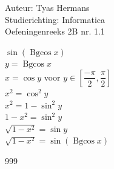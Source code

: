\documentclass[a4paper]{article}
\begin{document}
  
\noindent \large Auteur: Tyas Hermans \\
\noindent \large Studierichting: Informatica\\
\noindent \large Oefeningenreeks 2B  nr. 1.1 \\

\medskip

\normalsize

$\sin(\operatorname{Bgcos}x)$\\

$y = \operatorname{Bgcos}x$\\

$x = \cos y$ voor $y \in \left[\dfrac{-\pi}{2},\dfrac{\pi}{2}\right]$\\

$x^2 = \cos^2 y$\\

$x^2 = 1 - \sin^2 y$\\

$1-x^2 = \sin^2 y$\\

$\sqrt{1-x^2} = \sin y$\\

$\sqrt{1-x^2} = \sin(\operatorname{Bgcos}x)$\\




\begin{thebibliography}{999}
\end{thebibliography}
\end{document}
